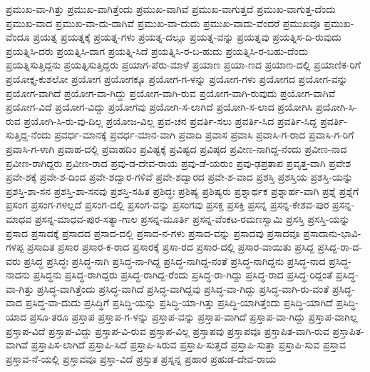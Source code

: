 ಪ್ರಮುಖ-ವಾ-ಗಿತ್ತು
ಪ್ರಮುಖ-ವಾಗಿತ್ತೆಂದು
ಪ್ರಮುಖ-ವಾಗಿವೆ
ಪ್ರಮುಖ-ವಾಗುತ್ತದೆ
ಪ್ರಮುಖ-ವಾಗುತ್ತ-ದೆಂದು
ಪ್ರಮುಖ-ವಾದ
ಪ್ರಮುಖ-ವಾ-ದು-ದಾಗಿವೆ
ಪ್ರಮುಖ-ವಾ-ದುದು
ಪ್ರಮುಖ-ವಾದು-ವೆಂದರೆ
ಪ್ರಮುಖವೂ
ಪ್ರಮುಖ-ವೆಂದೂ
ಪ್ರಯತ್ನ
ಪ್ರಯತ್ನಕ್ಕೆ
ಪ್ರಯತ್ನ-ಗಳು
ಪ್ರಯತ್ನ-ದಲ್ಲೂ
ಪ್ರಯತ್ನ-ವನ್ನು
ಪ್ರಯತ್ನವು
ಪ್ರಯತ್ನಿಸ-ದಿ-ರುವುದು
ಪ್ರಯತ್ನಿಸಿ-ದರು
ಪ್ರಯತ್ನಿಸಿ-ದಾಗ
ಪ್ರಯತ್ನಿ-ಸಿದೆ
ಪ್ರಯತ್ನಿಸಿ-ರ-ಬ-ಹುದು
ಪ್ರಯತ್ನಿಸಿ-ರ-ಬಹು-ದೆಂದು
ಪ್ರಯತ್ನಿಸುತ್ತಿದ್ದನು
ಪ್ರಯತ್ನಿಸುತ್ತಿದ್ದರು
ಪ್ರಯಾಗ-ಪೆರು-ಮಾಳೆ
ಪ್ರಯಾಣ
ಪ್ರಯಾ-ಣದ
ಪ್ರಯಾಣ-ದಲ್ಲಿ
ಪ್ರಯಾಣಿಕ-ರಿಗೆ
ಪ್ರಯೋಕ್ತೃ-ಕುಶಲೋ
ಪ್ರಯೋಗ
ಪ್ರಯೋಗಕ್ಕೂ
ಪ್ರಯೋಗ-ಗ-ಳನ್ನು
ಪ್ರಯೋಗ-ಗಳು
ಪ್ರಯೋಗದ
ಪ್ರಯೋಗ-ವನ್ನು
ಪ್ರಯೋಗ-ವಾಗಿದೆ
ಪ್ರಯೋಗ-ವಾ-ಗಿದ್ದು
ಪ್ರಯೋಗ-ವಾಗಿ-ರುವ
ಪ್ರಯೋಗ-ವಾಗಿ-ರುವುದು
ಪ್ರಯೋಗ-ವಾಗಿವೆ
ಪ್ರಯೋಗ-ವಿದೆ
ಪ್ರಯೋಗ-ವಿದ್ದು
ಪ್ರಯೋಗವು
ಪ್ರಯೋಗಿ-ಸ-ಲಾಗಿದೆ
ಪ್ರಯೋಗಿ-ಸ-ಲಾದ
ಪ್ರಯೋಗಿಸಿ
ಪ್ರಯೋಗಿ-ಸಿ-ರುವ
ಪ್ರಯೋಗಿ-ಸಿ-ರು-ವು-ದಿಲ್ಲ
ಪ್ರಯೋಜ-ವಿಲ್ಲ
ಪ್ರವ-ಚನ
ಪ್ರವರ್ತಿ-ಸಲು
ಪ್ರವರ್ತಿ-ಸಿದ
ಪ್ರವರ್ತಿ-ಸಿದ್ದ
ಪ್ರವರ್ತಿ-ಸುತ್ತಿದ್ದ-ನೆಂದು
ಪ್ರವರ್ಧ-ಮಾನಕ್ಕೆ
ಪ್ರವರ್ಧ-ಮಾನ-ವಾಗಿ
ಪ್ರವಾದಿ
ಪ್ರವಾಸ
ಪ್ರವಾಸಿ
ಪ್ರವಾಸಿ-ಗ-ರಾದ
ಪ್ರವಾಸಿ-ಗ-ರಿಗೆ
ಪ್ರವಾಸಿ-ಗ-ಳಾಗಿ
ಪ್ರವಾಹ-ದಲ್ಲಿ
ಪ್ರವಾಹದಿಂ
ಪ್ರವಿಷ್ಟಕ್ಕೆ
ಪ್ರವಿಷ್ಟದ
ಪ್ರವಿಷ್ಠದ
ಪ್ರವೀಣ-ನಾಗಿದ್ದ-ನೆಂದು
ಪ್ರವೀಣ-ನಾದ
ಪ್ರವೀಣ-ರಾಗಿದ್ದರು
ಪ್ರವೀಣ-ರಾದ
ಪ್ರವು-ಡ-ದೇವ-ರಾಯ
ಪ್ರವು-ಡೆ-ಯರುಂ
ಪ್ರವು-ಢಪ್ರತಾಪ
ಪ್ರವೃತ್ತ-ವಾಗಿ
ಪ್ರವೇಶ
ಪ್ರವೇ-ಶಕ್ಕೆ
ಪ್ರವೇ-ಶ-ದಿಂದ
ಪ್ರವೇ-ಶದ್ವಾರ-ಗಳಿವೆ
ಪ್ರವೇ-ಶದ್ವಾರದ
ಪ್ರವೇ-ಶ-ವಾದ
ಪ್ರಶಸ್ತಿ
ಪ್ರಶಸ್ತಿಯ
ಪ್ರಶಸ್ತಿ-ಯನ್ನು
ಪ್ರಶಸ್ತಿ-ಶಾ-ಸನ
ಪ್ರಶಸ್ತಿ-ಶಾ-ಸನವು
ಪ್ರಶಸ್ತಿ-ಸಹಿತ
ಪ್ರಶಿದ್ಧಃ
ಪ್ರಶಿಷ್ಯ
ಪ್ರಶಿಷ್ಯರು
ಪ್ರಶ್ನಾರ್ಥಕ
ಪ್ರಶ್ನಾರ್ಹ-ವಾಗಿ
ಪ್ರಶ್ನೆ
ಪ್ರಶ್ನೆಗೆ
ಪ್ರಸಂಗ
ಪ್ರಸಂಗ-ಗಳಲ್ಲದೆ
ಪ್ರಸಂಗ-ದಲ್ಲಿ
ಪ್ರಸಂಗ-ವನ್ನು
ಪ್ರಸಂಗವು
ಪ್ರಸಕ್ತ
ಪ್ರಸಕ್ತಿ
ಪ್ರಸನ್ನ
ಪ್ರಸನ್ನ-ಕೇಶವ-ಪುರ
ಪ್ರಸನ್ನ-ಮಾಧವ
ಪ್ರಸನ್ನ-ಮಾಧವ-ಪುರ-ಸತ್ಯಾ-ಗಾಲ
ಪ್ರಸನ್ನ-ಮೂರ್ತಿ
ಪ್ರಸನ್ನ-ವೆಂಕಟ-ರಮಣಸ್ವಾಮಿ
ಪ್ರಸಸ್ತಿ
ಪ್ರಸಸ್ತಿ-ಯನ್ನು
ಪ್ರಸಾದ
ಪ್ರಸಾದಕ್ಕೆ
ಪ್ರಸಾದದ
ಪ್ರಸಾದ-ದಲ್ಲಿ
ಪ್ರಸಾದ-ನ-ಗಳು
ಪ್ರಸಾದ-ವನ್ನು
ಪ್ರಸಾದವು
ಪ್ರಸಾದವೂ
ಪ್ರಸಾದಾನು-ಭಾವಿ-ಗಳಪ್ಪ
ಪ್ರಸಾದಿತ
ಪ್ರಸಾರ
ಪ್ರಸಾರ-ಕ-ರಾದ
ಪ್ರಸಾರಕ್ಕೆ
ಪ್ರಸಾ-ರದ
ಪ್ರಸಾರ-ದಲ್ಲಿ
ಪ್ರಸಾರ-ವಾಯಿತು
ಪ್ರಸಿದ್ದ
ಪ್ರಸಿದ್ದ-ರಾ-ದ-ವರು
ಪ್ರಸಿದ್ಧ
ಪ್ರಸಿದ್ಧಃ
ಪ್ರಸಿದ್ಧ-ನಾಗಿ
ಪ್ರಸಿದ್ಧ-ನಾ-ಗಿದ್ದ
ಪ್ರಸಿದ್ಧ-ನಾಗಿದ್ದ-ನಂತೆ
ಪ್ರಸಿದ್ಧ-ನಾಗಿದ್ದನು
ಪ್ರಸಿದ್ಧ-ನಾದ
ಪ್ರಸಿದ್ಧ-ನಾದನು
ಪ್ರಸಿದ್ಧನು
ಪ್ರಸಿದ್ಧ-ರಾಗಿದ್ದರು
ಪ್ರಸಿದ್ಧ-ರಾಗಿದ್ದ-ರೆಂದು
ಪ್ರಸಿದ್ಧ-ರಾ-ಗಿದ್ದು
ಪ್ರಸಿದ್ಧ-ರಾದ
ಪ್ರಸಿದ್ಧ-ರಿದ್ದಂತೆ
ಪ್ರಸಿದ್ಧ-ವಾ-ಗಿತ್ತು
ಪ್ರಸಿದ್ಧ-ವಾಗಿತ್ತೆಂದು
ಪ್ರಸಿದ್ಧ-ವಾಗಿದೆ
ಪ್ರಸಿದ್ಧ-ವಾಗಿದ್ದವು
ಪ್ರಸಿದ್ಧ-ವಾ-ಗಿದ್ದು
ಪ್ರಸಿದ್ಧ-ವಾಗಿ-ರು-ವಂತೆ
ಪ್ರಸಿದ್ಧ-ವಾದ
ಪ್ರಸಿದ್ಧ-ವಾ-ದುದು
ಪ್ರಸಿದ್ಧಿಗೆ
ಪ್ರಸಿದ್ಧಿ-ಯನ್ನು
ಪ್ರಸಿದ್ಧಿ-ಯಾ-ಗಿತ್ತು
ಪ್ರಸಿದ್ಧಿ-ಯಾಗಿತ್ತೆಂದು
ಪ್ರಸಿದ್ಧಿ-ಯಾಗಿದೆ
ಪ್ರಸಿದ್ಧಿ-ಯಾದ
ಪ್ರಸೂ-ತರೂ
ಪ್ರಸ್ತಾಪ
ಪ್ರಸ್ತಾಪ-ಗ-ಳನ್ನು
ಪ್ರಸ್ತಾಪ-ವನ್ನು
ಪ್ರಸ್ತಾಪ-ವಾಗಿದೆ
ಪ್ರಸ್ತಾಪ-ವಾ-ಗಿದ್ದು
ಪ್ರಸ್ತಾಪ-ವಾಗಿಲ್ಲ
ಪ್ರಸ್ತಾಪ-ವಿದೆ
ಪ್ರಸ್ತಾಪ-ವಿದ್ದು
ಪ್ರಸ್ತಾಪ-ವಿ-ರುವ
ಪ್ರಸ್ತಾಪ-ವಿಲ್ಲ
ಪ್ರಸ್ತಾಪವು
ಪ್ರಸ್ತಾಪವೂ
ಪ್ರಸ್ತಾಪಿತ-ವಾಗಿ-ರುವ
ಪ್ರಸ್ತಾಪಿತ-ವಾಗಿವೆ
ಪ್ರಸ್ತಾಪಿಸ-ಲಾಗಿದೆ
ಪ್ರಸ್ತಾಪಿ-ಸಿದೆ
ಪ್ರಸ್ತಾಪಿ-ಸಿರುವ
ಪ್ರಸ್ತಾಪಿ-ಸುತ್ತದೆ
ಪ್ರಸ್ತಾಪಿ-ಸುತ್ತಾ
ಪ್ರಸ್ತಾಪಿ-ಸುವ
ಪ್ರಸ್ತಾವ
ಪ್ರಸ್ತಾವ-ನೆ-ಯಲ್ಲಿ
ಪ್ರಸ್ತಾವವೂ
ಪ್ರಸ್ತಾ-ವಿದೆ
ಪ್ರಸ್ತುತ
ಪ್ರಸ್ನನ್ನ
ಪ್ರಹಾರ
ಪ್ರಹುಡ-ದೇವ-ರಾಯ
